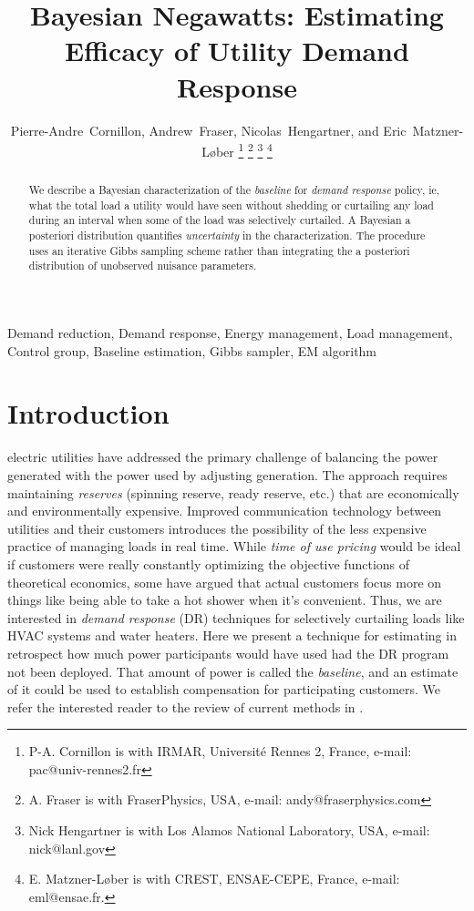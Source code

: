 \documentclass[journal]{IEEEtran}
\begin{document}
\title{Bayesian Negawatts: Estimating Efficacy of Utility Demand Response}

\author{
  Pierre-Andre~Cornillon,
  Andrew~Fraser,
  Nicolas~Hengartner,
  and Eric~Matzner-L{\o}ber
\thanks{P-A. Cornillon is with IRMAR, Universit\'e Rennes 2, France, e-mail: pac@univ-rennes2.fr}%
\thanks{A. Fraser is with FraserPhysics, USA, e-mail: andy@fraserphysics.com}%
\thanks{Nick Hengartner is with Los Alamos National Laboratory, USA,
  e-mail: nick@lanl.gov}%
\thanks{E. Matzner-L{\o}ber is with CREST, ENSAE-CEPE, France,
  e-mail: eml@ensae.fr.}
}
\maketitle

\begin{abstract}
  We describe a Bayesian characterization of the \emph{baseline} for
  \emph{demand response} policy, ie, what the total load a utility
  would have seen without shedding or curtailing any load during an
  interval when some of the load was selectively curtailed.  A
  Bayesian a posteriori distribution quantifies \emph{uncertainty} in
  the characterization.  The procedure uses an iterative Gibbs
  sampling scheme rather than integrating the a posteriori
  distribution of unobserved nuisance parameters.
\end{abstract}

\begin{IEEEkeywords}
Demand reduction, Demand response, Energy management, Load management,
Control group, Baseline estimation, Gibbs sampler, EM algorithm
\end{IEEEkeywords}

\IEEEpeerreviewmaketitle

\section{Introduction}
\label{sec:intro}

 electric utilities have addressed the
primary challenge of balancing the power generated with the power used
by adjusting generation.  The approach requires maintaining
\emph{reserves} (spinning reserve, ready reserve, etc.) that are
economically and environmentally expensive.  Improved communication
technology between utilities and their customers introduces the
possibility of the less expensive practice of managing loads in real
time.  While \emph{time of use pricing} would be ideal if customers
were really constantly optimizing the objective functions of
theoretical economics, some have argued\cite{meyn} that actual
customers focus more on things like being able to take a hot shower
when it's convenient.  Thus, we are interested in \emph{demand
  response} (DR) techniques for selectively curtailing loads like HVAC
systems and water heaters.  Here we present a technique for estimating
in retrospect how much power participants would have used had the DR
program not been deployed.  That amount of power is called the
\emph{baseline}, and an estimate of it could be used to establish
compensation for participating customers.  We refer the interested
reader to the review of current methods in \cite{directestimation}.
\end{document}
